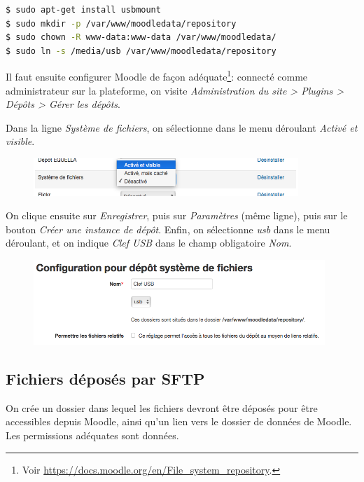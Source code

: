 \documentclass[11pt]{article}
\begin{document}
\begin{lstlisting}[language=bash]
$ sudo apt-get install usbmount
$ sudo mkdir -p /var/www/moodledata/repository
$ sudo chown -R www-data:www-data /var/www/moodledata/
$ sudo ln -s /media/usb /var/www/moodledata/repository
\end{lstlisting}

Il faut ensuite configurer Moodle de façon adéquate\footnote{Voir \url{https://docs.moodle.org/en/File_system_repository}.}: connecté comme administrateur sur la plateforme, on visite \emph{Administration du site > Plugins > Dépôts > Gérer les dépôts}.

Dans la ligne \emph{Système de fichiers}, on sélectionne dans le menu déroulant \emph{Activé et visible}.

\begin{figure}[!ht]
\begin{minipage}[b]{\linewidth}
\centering
\includegraphics[width=10cm]{repo-filesystem-usb-1.png}
\end{minipage}
\end{figure}

On clique ensuite sur \emph{Enregistrer}, puis sur \emph{Paramètres} (même ligne), puis sur le bouton \emph{Créer une instance de dépôt}. Enfin, on sélectionne \emph{usb} dans le menu déroulant, et on indique \emph{Clef USB} dans le champ obligatoire \emph{Nom}.

\begin{figure}[!ht]
\begin{minipage}[b]{\linewidth}
\centering
\includegraphics[width=11cm]{repo-filesystem-usb-2.png}
\end{minipage}
\end{figure}

\subsection{Fichiers déposés par SFTP}

On crée un dossier dans lequel les fichiers devront être déposés pour être accessibles depuis Moodle, ainsi qu'un lien vers le dossier de données de Moodle. Les permissions adéquates sont données.
\end{document}
